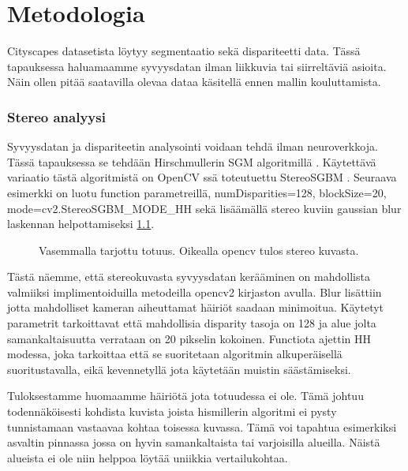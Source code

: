 \chapter{Metodologia}
\label{ch:metodologia}

Cityscapes datasetista löytyy segmentaatio sekä dispariteetti data. Tässä tapauksessa haluamaamme syvyysdatan ilman liikkuvia tai siirreltäviä asioita. Näin ollen pitää saatavilla olevaa dataa käsitellä ennen mallin kouluttamista.

\subsection{Stereo analyysi}

Syvyysdatan ja dispariteetin analysointi voidaan tehdä ilman neuroverkkoja. Tässä tapauksessa se tehdään Hirschmullerin SGM algoritmillä \cite{hirschmuller2005babel}. Käytettävä variaatio tästä algoritmistä on OpenCV ssä toteutuettu StereoSGBM \cite{opencvsgbm}. Seuraava esimerkki on luotu function parametreillä, numDisparities=128, blockSize=20, mode=cv2.StereoSGBM\_MODE\_HH sekä lisäämällä stereo kuviin gaussian blur laskennan helpottamiseksi \ref{fig:disparity1}.

\begin{figure}
\centering
{}
\caption[Tämä on lyhyt kuvateksti.]{Vasemmalla tarjottu totuus. Oikealla opencv tulos stereo kuvasta.}
\label{fig:disparity1}
\end{figure}
    
Tästä näemme, että stereokuvasta syvyysdatan kerääminen on mahdollista valmiiksi implimentoiduilla metodeilla opencv2 kirjaston avulla. Blur lisättiin jotta mahdolliset kameran aiheuttamat häiriöt saadaan minimoitua. Käytetyt parametrit tarkoittavat että mahdollisia disparity tasoja on 128 ja alue jolta samankaltaisuutta verrataan on 20 pikselin kokoinen. Functiota ajettin HH modessa, joka tarkoittaa että se suoritetaan algoritmin alkuperäisellä suoritustavalla, eikä kevennetyllä jota käytetään muistin säästämiseksi.

Tuloksestamme huomaamme häiriötä jota totuudessa ei ole. Tämä johtuu todennäköisesti kohdista kuvista joista hismillerin algoritmi ei pysty tunnistamaan vastaavaa kohtaa toisessa kuvassa. Tämä voi tapahtua esimerkiksi asvaltin pinnassa jossa on hyvin samankaltaista tai varjoisilla alueilla. Näistä alueista ei ole niin helppoa löytää uniikkia vertailukohtaa. 

